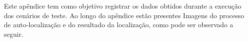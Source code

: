 
Este apêndice tem como objetivo registrar os dados obtidos durante a execução dos cenários de teste. Ao longo do apêndice estão presentes
Imagens do processo de auto-localização e do resultado da localização, como pode ser observado a seguir.







